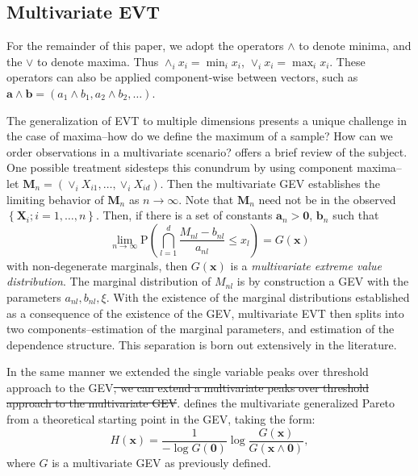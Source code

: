 \subsection{Multivariate EVT}
\label{subsec:mvevt}
For the remainder of this paper, we adopt the operators $\wedge$ to denote minima, and the $\vee$
  to denote maxima.  Thus $\wedge_i x_i = \min_i x_i$, $\vee_i x_i = \max_i x_i$.  These operators can
  also be applied component-wise between vectors, such as $\bm{a}\wedge\bm{b} = (a_1\wedge b_1, a_2\wedge b_2,\ldots)$.

The generalization of EVT to multiple dimensions presents a unique challenge in the case of maxima--how
  do we define the maximum of a sample?  How can we order observations in a multivariate scenario?
  \cite{rootzen2006} offers a brief review of the subject.  One possible treatment sidesteps this
  conundrum by using component maxima--let $\bm{M}_n = \left(\vee_i X_{i1},\ldots,\vee_i X_{id}\right)$.
  Then the multivariate GEV establishes the limiting behavior of $\bm{M}_n$ as $n\to\infty$.  Note
  that $\bm{M}_n$ need not be in the observed $\left\lbrace\bm{X}_i; i = 1,\ldots,n\right\rbrace$.
  Then, if there is a set of constants $\bm{a}_n > \bm{0}$, $\bm{b}_n$ such that
  \begin{equation*}
    \lim\limits_{n\to\infty}\text{P}\left(\bigcap_{l = 1}^d \frac{M_{nl} - b_{nl}}{a_{nl}} \leq x_l\right) = G(\bm{x})
  \end{equation*}
  with non-degenerate marginals, then $G(\bm{x})$ is a \emph{multivariate extreme value distribution}.
  The marginal distribution of $M_{nl}$ is by construction a GEV with the parameters $a_{nl}, b_{nl}, \xi$.
  With the existence of the marginal distributions established as a consequence of the existence of the
  GEV, multivariate EVT then splits into two components--estimation of the marginal parameters, and
  estimation of the dependence structure.  This separation is born out extensively in the literature.

In the same manner we extended the single variable peaks over threshold approach to the GEV\st{, we can
  extend a multivariate peaks over threshold approach to the multivariate GEV}.  \citet{rootzen2006}
  defines the multivariate generalized Pareto from a theoretical starting point in the GEV, taking
  the form:
  \begin{equation*}
    H(\bm{x}) = \frac{1}{-\log G(\bm{0})}\log\frac{G(\bm{x})}{G(\bm{x}\wedge \bm{0})},
  \end{equation*}
  where $G$ is a multivariate GEV as previously defined.

